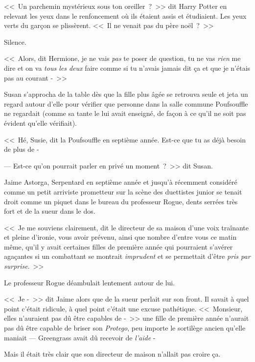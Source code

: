 \later

<<~Un parchemin mystérieux sous ton oreiller~?~>> dit Harry Potter en relevant les yeux dans le renfoncement où ils étaient assis et étudiaient. Les yeux verts du garçon se plissèrent. <<~Il ne venait pas du père noël~?~>>

Silence.

<<~Alors, dit Hermione, je ne vais \emph{pas} te poser de question, tu ne vas \emph{rien} me dire et on va \emph{tous les deux} faire comme si tu n'avais jamais dit ça et que je n'étais pas au courant -~>>

\later

Susan s'approcha de la table dès que la fille plus âgée se retrouva seule et jeta un regard autour d'elle pour vérifier que personne dans la salle commune Poufsouffle ne regardait (comme sa tante le lui avait enseigné, de façon à ce qu'il ne soit pas évident qu'elle vérifiait).

<<~Hé, Susie, dit la Poufsouffle en septième année. Est-ce que tu as déjà besoin de plus de -

--- Est-ce qu'on pourrait parler en privé un moment~?~>> dit Susan.

\later

Jaime Astorga, Serpentard en septième année et jusqu'à récemment considéré comme un petit arriviste prometteur sur la scène des duettistes junior se tenait droit comme un piquet dans le bureau du professeur Rogue, dents serrées très fort et de la sueur dans le dos.

<<~Je me souviens clairement, dit le directeur de sa maison d'une voix traînante et pleine d'ironie, vous avoir prévenu, ainsi que nombre d'entre vous ce matin même, qu'il y avait certaines filles de première année qui pourraient s'avérer agaçantes si un combattant se montrait \emph{imprudent} et se permettait d'être \emph{pris par surprise}.~>>

Le professeur Rogue déambulait lentement autour de lui.

<<~Je -~>> dit Jaime alors que de la sueur perlait sur son front. Il savait à quel point c'était ridicule, à quel point c'était une excuse pathétique. <<~Monsieur, elles n'auraient pas dû être capables de -~>> une fille de première année n'aurait pas dû être capable de briser son \emph{Protego}, peu importe le sortilège ancien qu'elle maniait — Greengrass avait dû recevoir de \emph{l'aide} -

Mais il était très clair que son directeur de maison n'allait pas croire ça.


